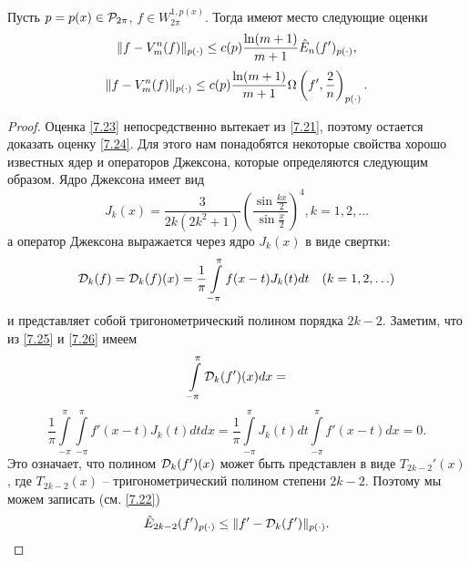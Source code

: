 \begin{theorem}\label{t5}
Пусть  $p=p(x)\in{\cal  P}_{2\pi}$,  $f\in W^{1,p(x)}_{2\pi}$. Тогда имеют место следующие оценки
\begin{equation}\label{7.23}
   \|f-V_m^n(f)\|_{p(\cdot)}\le c(p){\ln(m+1)\over m+1 }{\hat E}_n(f')_{p(\cdot)},
\end{equation}
\begin{equation}\label{7.24}
   \|f-V_m^n(f)\|_{p(\cdot)} \le c(p){\ln(m+1)\over m+1 }\Omega\left(f',\frac2{n}\right)_{p(\cdot)}.
\end{equation}
\end{theorem}
\begin{proof}
Оценка \eqref{7.23} непосредственно вытекает из \eqref{7.21}, поэтому  остается доказать оценку \eqref{7.24}.
Для этого нам понадобятся некоторые свойства хорошо известных ядер  и операторов Джексона, которые определяются следующим образом. Ядро Джексона имеет вид
\begin{equation}\label{7.25}
J_k(x)=\frac{3}{2k(2k^2+1)}\left(\frac{\sin\frac{kx}{2}}{\sin\frac{x}{2}}\right)^4,
k=1,2,\ldots
\end{equation}
а оператор Джексона выражается через ядро $J_k(x)$ в виде свертки:
\begin{equation}\label{7.26}
{\cal D}_k (f)={\cal D}_k (f)(x)=\frac1\pi \int\limits_{-\pi}^\pi
f(x-t)J_k(t)dt\quad(k=1,2,\ldots)
\end{equation}
и представляет собой тригонометрический полином порядка $2k-2$.
Заметим, что из \eqref{7.25} и \eqref{7.26} имеем
$$
\int\limits_{-\pi}^\pi{\cal D}_k (f')(x)dx=
$$
\begin{equation}\label{7.27}
      \frac1\pi \int\limits_{-\pi}^\pi\int\limits_{-\pi}^\pi
f'(x-t)J_k(t)dtdx=\frac1\pi\int\limits_{-\pi}^\pi J_k(t)dt\int\limits_{-\pi}^\pi f'(x-t)dx=0.
\end{equation}
Это означает, что  полином  ${\cal D}_k (f')(x)$ может быть представлен в виде $T_{2k-2}'(x)$, где  $T_{2k-2}(x)$ -- тригонометрический полином степени $2k-2$. Поэтому мы можем записать (см. \eqref{7.22})
\begin{equation}\label{7.28}
    {\hat E}_{2k-2}(f')_{p(\cdot)}\le \|f'-{\cal D}_k (f')\|_{p(\cdot)}.
\end{equation}


\end{proof}
